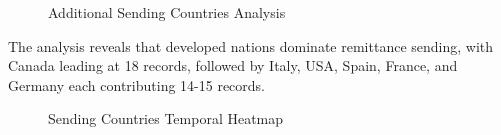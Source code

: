 \documentclass[
  11pt,
]{article}
\begin{document}
\begin{figure}[H]


\caption{\label{fig-sending-additional}Additional Sending Countries
Analysis}

\end{figure}%

The analysis reveals that developed nations dominate remittance sending,
with Canada leading at 18 records, followed by Italy, USA, Spain,
France, and Germany each contributing 14-15 records.

\begin{figure}[H]


\caption{\label{fig-sending-heatmap-detail}Sending Countries Temporal
Heatmap}

\end{figure}%
\end{document}
